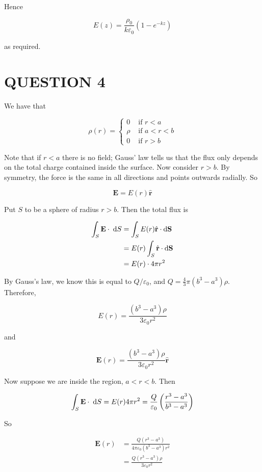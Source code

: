 \documentclass[a4paper]{article}
\begin{document}
Hence 

\[ E(z)  =  \frac{\rho_{0}}{k \varepsilon_{0}} (1 - e^{-kz}) \]

as required.




\section{QUESTION 4}

We have that

\[ \rho(r) = \begin{cases} 0  & \text{ if } r < a  \\ \rho & \text{ if } a < r < b \\ 0 & \text{ if } r > b \end{cases} \]


Note that if $ r < a $ there is no field; Gauss' law tells us that the flux only depends on the total charge contained inside the surface. Now consider $ r > b $. By symmetry, the force is the same in all directions and points outwards radially. So

\[  \mathbf{E} = E(r) \hat{\mathbf{r}} \]

Put $ S $ to be a sphere of radius $ r > b $. Then the total flux is 

\begin{align*}
\int_{S} \mathbf{E} \cdot \; \mathrm{d} S  & = \int_{S} E(r) \hat{\mathbf{r}} \cdot \mathrm{d} \mathbf{S} \\
& = E(r) \int_{S}  \hat{\mathbf{r}} \cdot \mathrm{d} \mathbf{S} \\
& = E(r) \cdot 4 \pi r^{2}
\end{align*}

By Gauss's law, we know this is equal to $ Q/\varepsilon_{0} $, and $ Q = \frac{4}{3} \pi (b^{3} - a^{3}) \rho $. Therefore,

\[ E(r) = \frac{ (b^{3} - a^{3}) \rho}{3\varepsilon_{0}r^{2}} \]

and

\[  \mathbf{E}(r) = \frac{ (b^{3} - a^{3})\rho}{3\varepsilon_{0}r^{2}} \hat{\mathbf{r}}  \]


Now suppose we are inside the region, $ a < r < b $. Then


\[ \int_{S} \mathbf{E} \cdot \; \mathrm{d} S = E(r) 4 \pi r^{2} = \frac{Q}{\varepsilon_{0}} \left(  \frac{r^{3}-a^{3}}{b^{3}-a^{3}} \right)  \]

So 

\begin{align*}
\mathbf{E}(r) & = \frac{Q(r^{3}-a^{3})}{4 \pi \varepsilon_{0}(b^{3}-a^{3}) r^{2}} \\
& = \frac{Q(r^{3}-a^{3})\rho}{3 \varepsilon_{0} r^{2}}
\end{align*}
\end{document}
